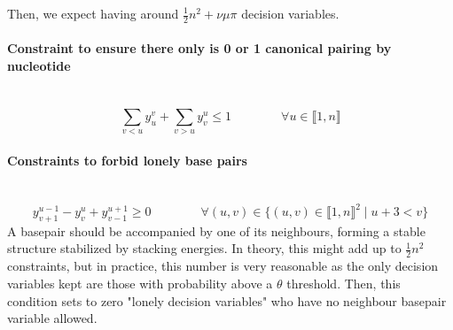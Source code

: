 \documentclass{article}
\begin{document}
Then, we expect having around $\frac{1}{2}n^2+\nu \mu \pi$ decision variables.

\paragraph{Constraint to ensure there only is 0 or 1 canonical pairing by nucleotide} ~ 
\begin{equation} \label{constraint:1}
	\sum_{v<u} y^v_u + \sum_{v>u} y^u_v \leq 1 \qquad\qquad \forall u \in \llbracket 1,n \rrbracket
\end{equation}

\paragraph{Constraints to forbid lonely base pairs} ~
\begin{equation} \label{constraint:2}
	y^{u-1}_{v+1} - y^u_v + y^{u+1}_{v-1} \geq 0 \qquad \qquad \forall (u,v) \in \{ (u,v) \in \llbracket 1,n\rrbracket^2 \; | \; u + 3 <v \}
\end{equation}
A basepair should be accompanied by one of its neighbours, forming a stable structure stabilized by stacking energies. In theory, this might add up to \( \frac{1}{2}n^2\) constraints, but in practice, this number is very reasonable as
the only decision variables kept are those with probability above a $\theta$ threshold. 
Then, this condition sets to zero "lonely decision variables" who have no neighbour basepair variable allowed.


\end{document}
